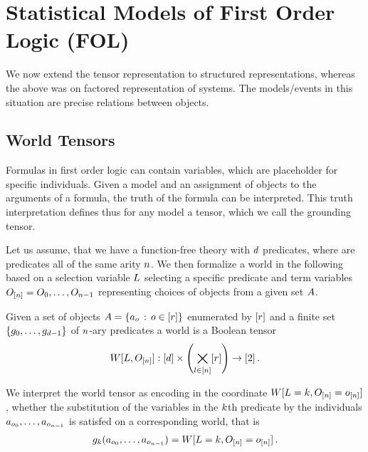 \section{Statistical Models of First Order Logic (FOL)}\label{cha:folModels}

We now extend the tensor representation to structured representations, whereas the above was on factored representation of systems.
The models/events in this situation are precise relations between objects.





%
\subsection{World Tensors}


Formulas in first order logic can contain variables, which are placeholder for specific individuals.
Given a model and an assignment of objects to the arguments of a formula, the truth of the formula can be interpreted.
This truth interpretation defines thus for any model a tensor, which we call the grounding tensor.

Let us assume, that we have a function-free theory with $d$ predicates, where are predicates all of the same arity $n$.
We then formalize a world in the following based on a selection variable $L$ selecting a specific predicate and term variables $O_{[n]}=O_{0},\ldots,O_{n-1}$ representing choices of objects from a given set $A$.

\begin{definition}
	Given a set of objects $A=\{a_{o} \, : \, o\in[r]\}$ enumerated by $[r]$ and a finite set $\{g_{0},\ldots,g_{d-1}\}$ of $n$-ary predicates a world is a Boolean tensor
	\begin{align}
		W[L,O_{[n]}] : [d] \times \left( \bigtimes_{l\in[n]} [r] \right) \rightarrow [2] \, . 
	\end{align}
	
	We interpret the world tensor as encoding in the coordinate $W[L=k,O_{[n]}=o_{[n]}]$, whether the substitution of the variables in the $k$th predicate by the individuals $a_{o_{0}},\ldots,a_{o_{n-1}}$ is satisfed on a corresponding world, that is
	\begin{align*}
		g_{k}(a_{o_{0}},\ldots,a_{o_{n-1}}) = W[L=k,O_{[n]}=o_{[n]}] \, . 
	\end{align*}
\end{definition}


